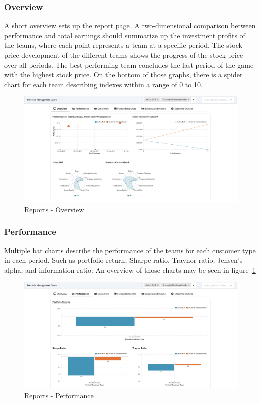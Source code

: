 \subsubsection{Overview}
A short overview sets up the report page. A two-dimensional comparison between performance and total earnings should summarize up the investment profits of the teams, where each point represents a team at a specific period. The stock price development of the different teams shows the progress of the stock price over all periods. The best performing team concludes the last period of the game with the highest stock price. On the bottom of those graphs, there is a spider chart for each team describing indexes within a range of 0 to 10.
\begin{figure}[h!]
  \centering
  \includegraphics[scale=0.2]{img/application-overview/reports/01_overview.png}
  \caption{Reports - Overview}
\end{figure}

\subsubsection{Performance}
Multiple bar charts describe the performance of the teams for each customer type in each period. Such as portfolio return, Sharpe ratio, Traynor ratio, Jensen's alpha, and information ratio. An overview of those charts may be seen in figure~\ref{fig:reports_performance}
\begin{figure}[h!]
  \centering
  \includegraphics[scale=0.2]{img/application-overview/reports/02_performance.png}
  \caption{Reports - Performance}
  \label{fig:reports_performance}
\end{figure}

